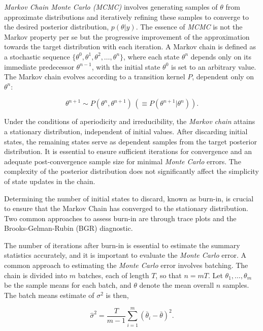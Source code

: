 \documentclass[
  11pt,
]{article}
\begin{document}
\emph{Markov Chain Monte Carlo (MCMC)} involves generating samples of
\(\theta\) from approximate distributions and iteratively refining these
samples to converge to the desired posterior distribution,
\(p(\theta|y)\). The essence of \emph{MCMC} is not the Markov property
per se but the progressive improvement of the approximation towards the
target distribution with each iteration. A Markov chain is defined as a
stochastic sequence
\(\{\theta^0, \theta^1, \theta^2, \ldots, \theta^n\}\), where each state
\(\theta^n\) depends only on its immediate predecessor \(\theta^{n-1}\),
with the initial state \(\theta^0\) is set to an arbitrary value. The
Markov chain evolves according to a transition kernel \(P\), dependent
only on \(\theta^n\):

\begin{equation}
\theta^{n+1} \sim P(\theta^n, \theta^{n+1}) \, (\equiv P(\theta^{n+1}|\theta^n)).
\end{equation}

Under the conditions of aperiodicity and irreducibility, the
\emph{Markov chain} attains a stationary distribution, independent of
initial values. After discarding initial states, the remaining states
serve as dependent samples from the target posterior distribution. It is
essential to ensure sufficient iterations for convergence and an
adequate post-convergence sample size for minimal \emph{Monte Carlo}
errors. The complexity of the posterior distribution does not
significantly affect the simplicity of state updates in the chain.

Determining the number of initial states to discard, known as burn-in,
is crucial to ensure that the Markov Chain has converged to the
stationary distribution. Two common approaches to assess burn-in are
through trace plots and the Brooks-Gelman-Rubin (BGR) diagnostic.

The number of iterations after burn-in is essential to estimate the
summary statistics accurately, and it is important to evaluate the
\emph{Monte Carlo} error. A common approach to estimating the
\emph{Monte Carlo} error involves batching. The chain is divided into
\(m\) batches, each of length \(T\), so that \(n = mT\). Let
\(\theta_1,\ldots,\theta_m\) be the sample means for each batch, and
\(\theta\) denote the mean overall \(n\) samples. The batch means
estimate of \(\sigma^2\) is then,

\begin{equation}
\hat{\sigma}^2 = \frac{T}{m - 1} \sum_{i=1}^{m}(\bar{\theta}_i - \bar{\theta})^2.
\end{equation}
\end{document}
